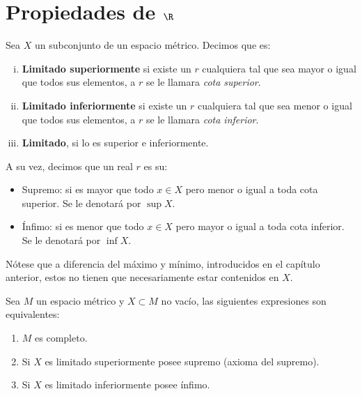 \documentclass[11pt,oneside,a4paper]{book}
\begin{document}
\section{Propiedades de $\R$}
\begin{mydef}
Sea $X$ un subconjunto de un espacio métrico. Decimos que es:
\begin{enumerate}[i)]
\item \textbf{Limitado superiormente} si existe un $r$ cualquiera tal que sea mayor o igual que todos sus elementos, a $r$ se le llamara \textit{cota superior}.
\item \textbf{Limitado inferiormente} si existe un $r$ cualquiera tal que sea menor o igual que todos sus elementos, a $r$ se le llamara \textit{cota inferior}.
\item \textbf{Limitado}, si lo es superior e inferiormente.
\end{enumerate}
A su vez, decimos que un real $r$ es su:
\begin{itemize}
\item Supremo: si es mayor que todo $x\in X$ pero menor o igual a toda cota superior. Se le denotará por $\sup X$.
\item Ínfimo: si es menor que todo $x\in X$ pero mayor o igual a toda cota inferior. Se le denotará por $\inf X$.
\end{itemize}
\end{mydef}
Nótese que a diferencia del máximo y mínimo, introducidos en el capítulo anterior, estos no tienen que necesariamente estar contenidos en $X$.
\begin{thm}
Sea $M$ un espacio métrico y $X\subset M$ no vacío, las siguientes expresiones son equivalentes:
\begin{enumerate}[$a$)]
\item $M$ es completo.
\item Si $X$ es limitado superiormente posee supremo (axioma del supremo).
\item Si $X$ es limitado inferiormente posee ínfimo.
\end{enumerate}
\end{thm}
\end{document}
